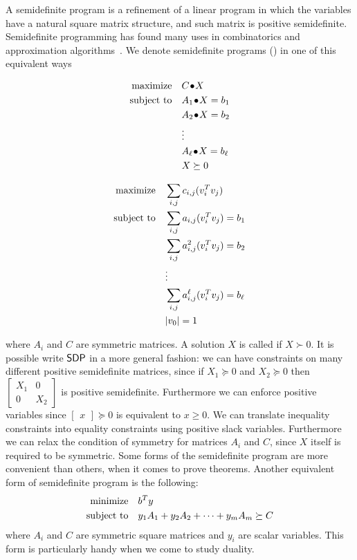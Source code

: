 \documentclass[a4paper,twoside,justified]{tufte-handout}
\begin{document}
A semidefinite program is a refinement of a linear program in which
the variables have a natural square matrix structure, and such
matrix is positive semidefinite. Semidefinite programming
has found many uses in combinatorics and approximation
algorithms~\cite{gartner2012approximation}.
%
We denote semidefinite programs (\sdp) in one of this equivalent ways

\begin{minipage}[t]{0.5\textwidth}
\begin{alignat*}{2}
  \maximize \pointwiseprod{C}{X}\\
  \subjectto \pointwiseprod{A_{1}}{X} = b_{1}\\
  & \pointwiseprod{A_{2}}{X} = b_{2}\\
  & \vdots \\
  & \pointwiseprod{A_{\ell}}{X} = b_{\ell}\\
  & X \succeq 0
\end{alignat*}
\end{minipage}
\begin{minipage}[t]{0.5\textwidth}
\begin{alignat*}{2}
  \text{maximize}\hspace{1em}& \sum_{i,j}c_{i,j} (v_{i}^{T}v_{j}) \\
  \text{subject to}\hspace{1em}& \sum_{i,j} a_{i,j} (v^{T}_{i}v_{j})= b_{1}\\
  & \sum_{i,j} a^{2}_{i,j} (v^{T}_{i}v_{j})= b_{2}\\
  & \vdots \\
  & \sum_{i,j} a^{\ell}_{i,j} (v^{T}_{i}v_{j})= b_{\ell}\\
  & |v_{0}| = 1
\end{alignat*}
\end{minipage}
%
where $ A_i $ and $ C $ are symmetric matrices.  
%
A solution $X$ is called  if $ X
\succ 0 $.
%
It is possible write
$\mathsf{SDP}$ in a more general fashion: we can have constraints on many
different positive semidefinite matrices, since if $ X_{1}\succeq 0 $
and $ X_{2} \succeq 0$ then $ \begin{bmatrix}
  X_{1} & 0 \\
  0 & X_{2}
\end{bmatrix} $ is positive semidefinite. Furthermore we can enforce
positive variables since $ \begin{bmatrix}
  x
\end{bmatrix} \succeq 0$ is equivalent to $ x \geq 0$. We can
translate inequality constraints into equality constraints using
positive slack variables. Furthermore we can relax the condition of
symmetry for matrices $ A_{i} $ and $ C $, since $ X $ itself is
required to be symmetric. Some forms of the semidefinite program are
more convenient than others, when it comes to prove theorems.
%
Another equivalent form of semidefinite program is the following:
\begin{alignat*}{2}
  \text{minimize}\hspace{1em}& b^{T}y\\
  \text{subject to}\hspace{1em}& y_{1}A_{1} + y_{2}A_{2} + \cdots + y_{m}A_{m} \succeq C
\end{alignat*} 
where $ A_{i} $ and $ C $ are symmetric square matrices and $ y_{i} $
are scalar variables. This form is particularly handy when we come to
study duality.
\end{document}
